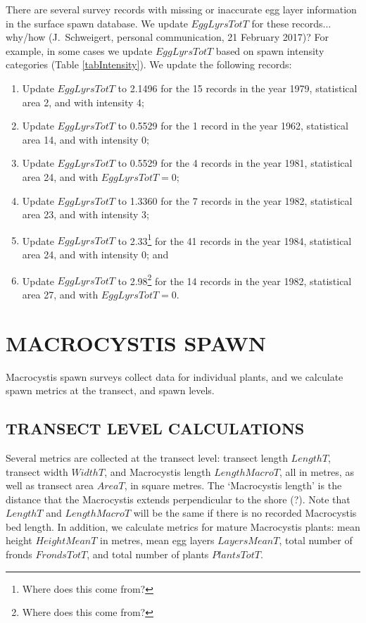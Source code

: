 \documentclass[12pt]{article}
\begin{document}
There are several survey records with missing or inaccurate egg layer information in the surface spawn database.
We update $EggLyrsTotT$ for these records... why/how  (J.~Schweigert, personal communication, 21 February 2017)?
For example, in some cases we update $EggLyrsTotT$ based on spawn intensity categories (Table \ref{tabIntensity}).
We update the following records:
\begin{enumerate}
\item Update $EggLyrsTotT$ to 2.1496 for the 15 records in the year 1979, statistical area 2, and with intensity 4; \label{up1979}
\item Update $EggLyrsTotT$ to 0.5529 for the 1 record in the year 1962, statistical area 14, and with intensity 0; \label{up1962}
\item Update $EggLyrsTotT$ to 0.5529 for the 4 records in the year 1981, statistical area 24, and with $EggLyrsTotT = 0$; \label{up1981}
\item Update $EggLyrsTotT$ to 1.3360 for the 7 records in the year 1982, statistical area 23, and with intensity 3; \label{up1982a}
\item Update $EggLyrsTotT$ to 2.33\footnote{Where does this come from?} for the 41 records in the year 1984, statistical area 24, and with intensity 0; and \label{up1984}
\item Update $EggLyrsTotT$ to 2.98\footnote{Where does this come from?} for the 14 records in the year 1982, statistical area 27, and with $EggLyrsTotT = 0$. \label{up1982b}
\end{enumerate}

\section{MACROCYSTIS SPAWN}\label{secMacro}

Macrocystis spawn surveys collect data for individual plants, and we calculate spawn metrics at the transect, and spawn levels.

\subsection{TRANSECT LEVEL CALCULATIONS}

Several metrics are collected at the transect level: transect length $LengthT$, transect width $WidthT$, and Macrocystis length $LengthMacroT$, all in metres, as well as transect area $AreaT$, in square metres.
The `Macrocystis length' is the distance that the Macrocystis extends perpendicular to the shore (?).
Note that $LengthT$ and $LengthMacroT$ will be the same if there is no recorded Macrocystis bed length.
In addition, we calculate metrics for mature Macrocystis plants: mean height $HeightMeanT$ in metres, mean egg layers $LayersMeanT$, total number of fronds $FrondsTotT$, and total number of plants $PlantsTotT$.
\end{document}
